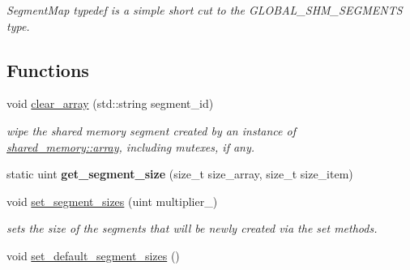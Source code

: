 \begin{DoxyCompactItemize}
\begin{DoxyCompactList}\small\item\em Segment\+Map typedef is a simple short cut to the G\+L\+O\+B\+A\+L\+\_\+\+S\+H\+M\+\_\+\+S\+E\+G\+M\+E\+N\+TS type. \end{DoxyCompactList}\end{DoxyCompactItemize}
\subsection*{Functions}
\begin{DoxyCompactItemize}
\item 
void \hyperlink{namespaceshared__memory_a0371eb6089f446098adf2f9c106333dc}{clear\+\_\+array} (std\+::string segment\+\_\+id)
\begin{DoxyCompactList}\small\item\em wipe the shared memory segment created by an instance of \hyperlink{classshared__memory_1_1array}{shared\+\_\+memory\+::array}, including mutexes, if any. \end{DoxyCompactList}\item 
static uint {\bfseries get\+\_\+segment\+\_\+size} (size\+\_\+t size\+\_\+array, size\+\_\+t size\+\_\+item)\hypertarget{namespaceshared__memory_a62e06d817f0f52addc9970db9f83e15d}{}\label{namespaceshared__memory_a62e06d817f0f52addc9970db9f83e15d}

\item 
void \hyperlink{namespaceshared__memory_ac8ef94dc78f444092f488f0143b155f2}{set\+\_\+segment\+\_\+sizes} (uint multiplier\+\_)
\begin{DoxyCompactList}\small\item\em sets the size of the segments that will be newly created via the set methods. \end{DoxyCompactList}\item 
void \hyperlink{namespaceshared__memory_a841687861fcc9efe381ffbe84843ca33}{set\+\_\+default\+\_\+segment\+\_\+sizes} ()\hypertarget{namespaceshared__memory_a841687861fcc9efe381ffbe84843ca33}{}\label{namespaceshared__memory_a841687861fcc9efe381ffbe84843ca33}


\end{DoxyCompactItemize}
